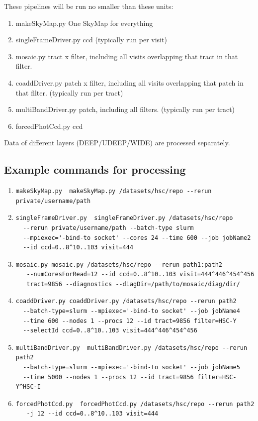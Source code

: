 \documentclass[DM,authoryear,toc]{lsstdoc}
\begin{document}
These pipelines will be run no smaller than these units:
\begin{enumerate}
\item
makeSkyMap.py  One SkyMap for everything
\item
singleFrameDriver.py  ccd (typically run per visit)
\item
mosaic.py tract x filter, including all visits overlapping that tract in that filter.
\item
coaddDriver.py patch x filter, including all visits overlapping that patch in that filter. (typically run per tract)
\item
multiBandDriver.py  patch, including all filters. (typically run per tract)
\item
forcedPhotCcd.py  ccd
\end{enumerate}
Data of different layers (DEEP/UDEEP/WIDE) are processed separately.

\subsection{Example commands for processing}
\begin{enumerate}
\item
\begin{verbatim}
makeSkyMap.py  makeSkyMap.py /datasets/hsc/repo --rerun private/username/path
\end{verbatim}
\item
\begin{verbatim}
singleFrameDriver.py  singleFrameDriver.py /datasets/hsc/repo
  --rerun private/username/path --batch-type slurm
  --mpiexec='-bind-to socket' --cores 24 --time 600 --job jobName2
  --id ccd=0..8^10..103 visit=444
\end{verbatim}
\item
\begin{verbatim}
mosaic.py mosaic.py /datasets/hsc/repo --rerun path1:path2
   --numCoresForRead=12 --id ccd=0..8^10..103 visit=444^446^454^456
   tract=9856 --diagnostics --diagDir=/path/to/mosaic/diag/dir/
\end{verbatim}
\item
\begin{verbatim}
coaddDriver.py coaddDriver.py /datasets/hsc/repo --rerun path2
  --batch-type=slurm --mpiexec='-bind-to socket' --job jobName4
  --time 600 --nodes 1 --procs 12 --id tract=9856 filter=HSC-Y
  --selectId ccd=0..8^10..103 visit=444^446^454^456
\end{verbatim}
\item
\begin{verbatim}
multiBandDriver.py  multiBandDriver.py /datasets/hsc/repo --rerun path2
  --batch-type=slurm --mpiexec='-bind-to socket' --job jobName5
  --time 5000 --nodes 1 --procs 12 --id tract=9856 filter=HSC-Y^HSC-I
\end{verbatim}
\item
\begin{verbatim}
forcedPhotCcd.py  forcedPhotCcd.py /datasets/hsc/repo --rerun path2
   -j 12 --id ccd=0..8^10..103 visit=444
\end{verbatim}
\end{enumerate}
\end{document}

